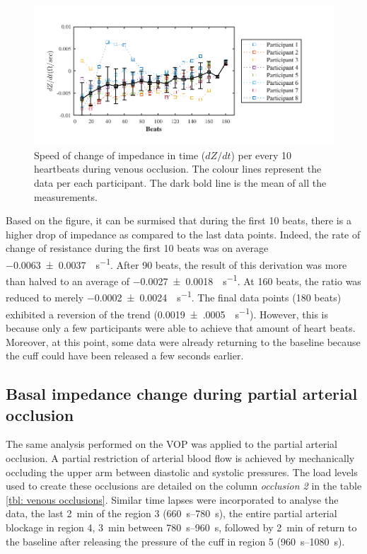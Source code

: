 \begin{figure}[htbp]
	\centering
	\includegraphics[width=15cm,keepaspectratio]{figure_vop_3}    
	\caption[Rate of change of impedance per 10 heartbeats during venous occlusion]{Speed of change of impedance in time ($dZ/dt$) per every 10 heartbeats during venous occlusion. The colour lines represent the data per each participant. The dark bold line is the mean of all the measurements.}
	\label{fig:venous occlusion change}
\end{figure}

Based on the figure, it can be surmised that during the first 10 beats, there is a higher drop of impedance as compared to the last data points. Indeed, the rate of change of resistance during the first 10 beats was on average \SI{-0.0063(00037)}{\Omega\per\second}. After 90 beats, the result of this derivation was more than halved to an average of \SI{-0.0027(00018)}{\Omega\per\second}. At 160 beats, the ratio was reduced to merely \SI{-0.0002(00024)}{\Omega\per\second}. The final data points (180 beats) exhibited a reversion of the trend (\SI{0.0019(0005)}{\Omega\per\second}). However, this is because only a few participants were able to achieve that amount of heart beats.  Moreover, at this point, some data were already returning to the baseline because the cuff could have been released a few seconds earlier.  

\subsection{Basal impedance change during partial arterial occlusion}
\label{section occlusion 1.2}
The same analysis performed on the VOP was applied to the partial arterial occlusion. A partial restriction of arterial blood flow is achieved by mechanically occluding the upper arm between diastolic and systolic pressures. The load levels used to create these occlusions are detailed on the column \textit{occlusion 2} in the table \ref{tbl: venous occlusions}. Similar time lapses were incorporated to analyse the data, the last \SI{2}{\minute} of the region 3 (\SIrange{660}{780}{\second}), the entire partial arterial blockage in region 4, \SI{3}{\minute} between \SIrange{780}{960}{\second}, followed by \SI{2}{\minute} of return to the baseline after releasing the pressure of the cuff in region 5 (\SIrange{960}{1080}{\second}).

